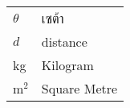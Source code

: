 \begin{symbols}
    \noindent
    \begin{tabular*}{\textwidth}{@{}p{}p{}@{}}
        {$\theta$} & {เซต้า} \\
        {$d$} & {distance} \\
        {kg} & {Kilogram} \\
        {m$^{2}$} & {Square Metre} \\
    \end{tabular*}
\end{symbols}